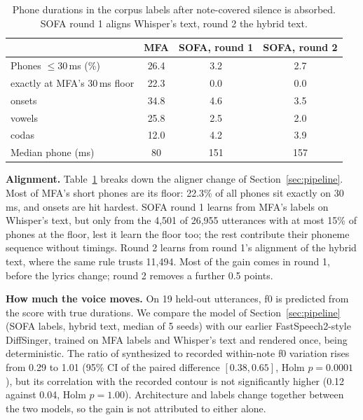 \documentclass[wcp]{jmlr}
\begin{document}
\begin{table}[h]
\centering
\small
\caption{Phone durations in the corpus labels after note-covered silence is absorbed.
SOFA round 1 aligns Whisper's text, round 2 the hybrid text.}
\label{tab:align}
\begin{tabular}{lccc}
\toprule
 & MFA & SOFA, round 1 & SOFA, round 2 \\
\midrule
Phones $\le$30\,ms (\%) & 26.4 & 3.2 & 2.7 \\
\quad exactly at MFA's 30\,ms floor & 22.3 & 0.0 & 0.0 \\
\quad onsets & 34.8 & 4.6 & 3.5 \\
\quad vowels & 25.8 & 2.5 & 2.0 \\
\quad codas & 12.0 & 4.2 & 3.9 \\
Median phone (ms) & 80 & 151 & 157 \\
\bottomrule
\end{tabular}
\end{table}

\textbf{Alignment.} Table~\ref{tab:align} breaks down the aligner change of
Section~\ref{sec:pipeline}. Most of MFA's short phones are its floor: 22.3\% of all phones
sit exactly on 30\,ms, and onsets are hit hardest. SOFA round 1 learns from MFA's labels
on Whisper's text, but only from the 4,501 of 26,955 utterances with at most 15\% of phones
at the floor, lest it learn the floor too; the rest contribute their phoneme sequence
without timings. Round 2 learns from round 1's alignment of the hybrid text, where the
same rule trusts 11,494. Most of the gain comes in round 1, before the lyrics change; round
2 removes a further 0.5 points.

\textbf{How much the voice moves.} On 19 held-out utterances, f0 is predicted from the
score with true durations. We compare the model of Section~\ref{sec:pipeline} (SOFA
labels, hybrid text, median of 5 seeds) with our earlier FastSpeech2-style DiffSinger,
trained on MFA labels and Whisper's text and rendered once, being deterministic. The ratio
of synthesized to recorded within-note f0 variation rises from 0.29 to 1.01 (95\% CI of
the paired difference $[0.38, 0.65]$, Holm $p{=}0.0001$), but its correlation with the
recorded contour is not significantly higher (0.12 against 0.04, Holm $p{=}1.00$).
Architecture and labels change together between the two models, so the gain is not
attributed to either alone.
\end{document}
